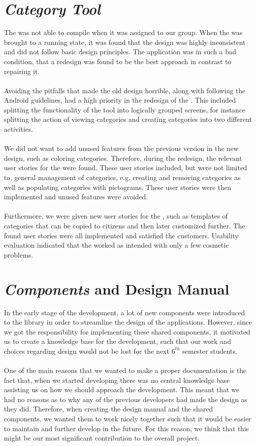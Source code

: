 \section*{\emph{Category Tool}}
The \ct was not able to compile when it was assigned to our group. When the \ct was brought to a running state, it was found that the design was highly inconsistent and did not follow basic design principles. The application was in such a bad condition, that a redesign was found to be the best approach in contrast to repairing it.
\\\\
Avoiding the pitfalls that made the old design horrible, along with following the Android guidelines, had a high priority in the redesign of the \ct. This included splitting the functionality of the tool into logically grouped screens, for instance splitting the action of viewing categories and creating categories into two different activities.
\\\\
We did not want to add unused features from the previous version in the new design, such as coloring categories. Therefore, during the redesign, the relevant user stories for the \ct were found. These user stories included, but were not limited to, general management of categories, e.g. creating and removing categories as well as populating categories with pictograms. These user stories were then implemented and unused features were avoided. 
\\\\
Furthermore, we were given new user stories for the \ct, such as templates of categories that can be copied to citizens and then later customized further. The found user stories were all implemented and satisfied the customers. Usability evaluation indicated that the \ct worked as intended with only a few cosmetic problems.

\section*{\giraf \emph{Components} and Design Manual}
In the early stage of the development, a lot of new components were introduced to the \gc library in order to streamline the design of the \giraf applications. However, since we got the responsibility for implementing these shared components, it motivated us to create a knowledge base for the development, such that our work and choices regarding design would not be lost for the next $6^{th}$ semester students. 
\\\\
One of the main reasons that we wanted to make a proper documentation is the fact that, when we started developing there was no central knowledge base assisting us on how we should approach the development. This meant that we had no reasons as to why any of the previous \giraf developers had made the design as they did. Therefore, when creating the design manual and the shared components, we wanted them to work nicely together such that it would be easier to maintain and further develop in the future. For this reason, we think that this might be our most significant contribution to the overall project.
